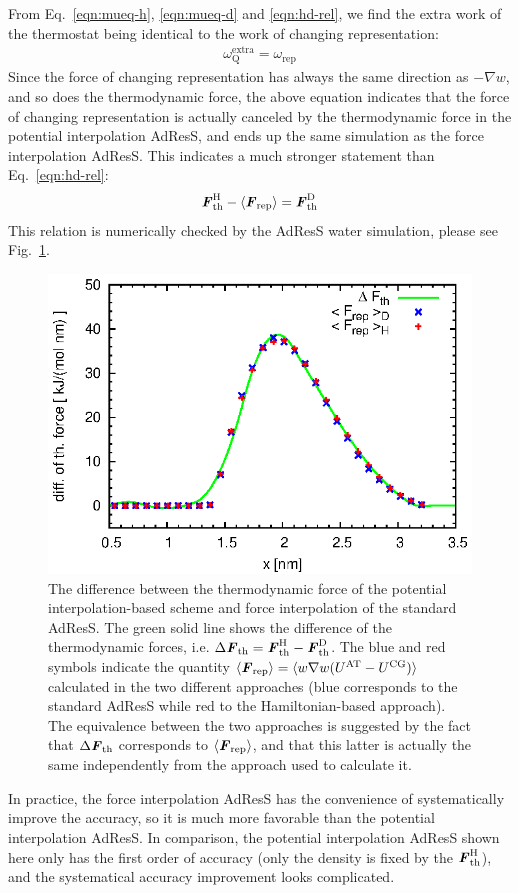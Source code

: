 \documentclass[aip,jcp,a4paper,reprint,onecolumn]{revtex4-1}
\newcommand{\vect}[1]{\textbf{\textit{#1}}}
\newcommand{\AT}{{\textrm{{AT}}}}
\newcommand{\CG}{{\textrm{CG}}}
\newcommand{\thf}{{\textrm{th}}}
\newcommand{\res}{{\textrm{rep}}}
\newcommand{\ext}{{\textrm{extra}}}
\newcommand{\thermo}{{\textrm{Q}}}
\newcommand{\hadress}{{\textrm{H}}}
\newcommand{\dadress}{{\textrm{D}}}
\begin{document}
From Eq.~\eqref{eqn:mueq-h}, \eqref{eqn:mueq-d} and \eqref{eqn:hd-rel}, we
find the extra work of the thermostat being identical to the work of changing
representation:
\begin{align}
  \omega_\thermo^\ext = \omega_\res
\end{align}
Since the force of changing representation has always the same
direction as $-\nabla w$, and so does the thermodynamic force, the
above equation indicates that the force of changing representation is
actually canceled by the thermodynamic force in the potential
interpolation AdResS, and ends up the same simulation as the force
interpolation AdResS. This indicates a much stronger statement than Eq.~\eqref{eqn:hd-rel}:
\begin{align}
  \vect F_\thf^\hadress - \langle\vect F_\res\rangle = \vect F_\thf^\dadress
\end{align}
This relation is numerically checked by the AdResS water simulation, please see Fig.~\ref{fig:tmp1}.
\begin{figure}
  \centering
  \includegraphics[]{fig/diff.thf/diff-thf.eps}
  \caption{The difference between the thermodynamic force of the
    potential interpolation-based scheme and force interpolation of the standard AdResS.
    The green solid line shows the difference of the thermodynamic
    forces, i.e. $\Delta{\vect F}_\thf={\vect F}_\thf^\hadress-{\vect F}_\thf^\dadress$.
    The blue and red symbols indicate the quantity $\langle \vect F_\res\rangle = \langle w\nabla w(U^{\AT}-U^{\CG})\rangle$ calculated in the two different approaches (blue corresponds to the standard AdResS while red to the Hamiltonian-based approach). The equivalence between the two approaches is suggested by the fact that $\Delta{\vect F}_\thf$ corresponds to $\langle \vect F_\res\rangle$, and that this latter is actually the same independently from the approach used to calculate it.}
  \label{fig:tmp1}
\end{figure}
In practice, the force interpolation AdResS has
the convenience of systematically improve the accuracy,
so it is much more favorable than the potential interpolation
AdResS. In comparison, the potential interpolation AdResS
shown here only has the first order of accuracy (only the density is
fixed by the $\vect F_\thf^\hadress$), and the systematical accuracy
improvement looks complicated.
\end{document}
